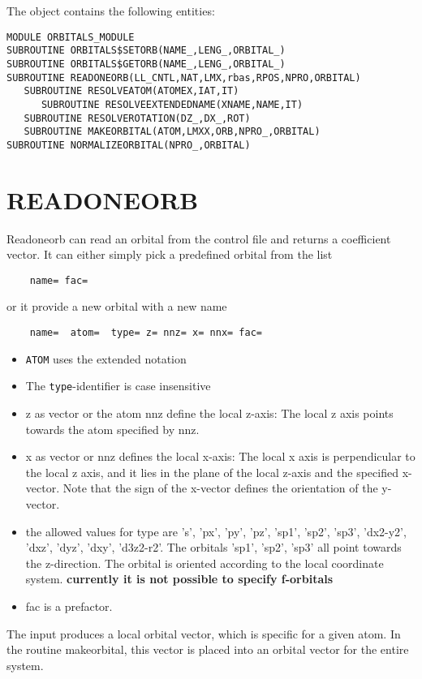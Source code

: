 \documentclass[11pt,a4paper]{report}
\begin{document}
The object contains the following entities:
\begin{verbatim}
MODULE ORBITALS_MODULE
SUBROUTINE ORBITALS$SETORB(NAME_,LENG_,ORBITAL_)
SUBROUTINE ORBITALS$GETORB(NAME_,LENG_,ORBITAL_)
SUBROUTINE READONEORB(LL_CNTL,NAT,LMX,rbas,RPOS,NPRO,ORBITAL)
   SUBROUTINE RESOLVEATOM(ATOMEX,IAT,IT)
      SUBROUTINE RESOLVEEXTENDEDNAME(XNAME,NAME,IT)
   SUBROUTINE RESOLVEROTATION(DZ_,DX_,ROT)
   SUBROUTINE MAKEORBITAL(ATOM,LMXX,ORB,NPRO_,ORBITAL)
SUBROUTINE NORMALIZEORBITAL(NPRO_,ORBITAL)
\end{verbatim}


\section{READONEORB}
Readoneorb can read an orbital from the control file and returns a
coefficient vector. It can either simply pick a predefined orbital
from the list
\begin{verbatim}
    name= fac= 
\end{verbatim}
or it provide a new orbital with a new name
\begin{verbatim}
    name=  atom=  type= z= nnz= x= nnx= fac=
\end{verbatim}
\begin{itemize}
\item \verb|ATOM| uses the extended notation
\item The \verb|type|-identifier is case insensitive
\item z as vector or the atom nnz define the local z-axis: The
  local z axis points towards the atom specified by nnz.
\item x as vector or nnz defines the local x-axis: The local x axis is
  perpendicular to the local z axis, and it lies in the plane of the
  local z-axis and the specified x-vector. Note that the sign of the
  x-vector defines the orientation of the y-vector.
\item the allowed values for type are 's', 'px', 'py', 'pz', 'sp1',
  'sp2', 'sp3', 'dx2-y2', 'dxz', 'dyz', 'dxy', 'd3z2-r2'. The orbitals
  'sp1', 'sp2', 'sp3' all point towards the z-direction. The orbital
  is oriented according to the local coordinate
  system. \textbf{currently it is not possible to specify f-orbitals}
\item fac is a prefactor.
\end{itemize}

The input produces a local orbital vector, which is specific for a
given atom. In the routine makeorbital, this vector is placed into an
orbital vector for the entire system.



\appendix
\section{}



\end{document}
